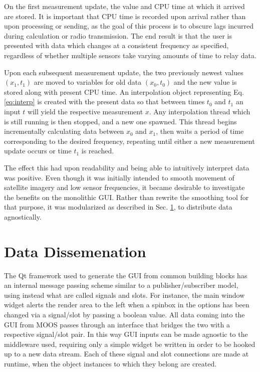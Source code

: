 \documentclass[12pt]{report}
\begin{document}
On the first measurement update, the value and CPU time at which it arrived are stored. It is important that CPU time is recorded upon arrival rather than upon processing or sending, as the goal of this process is to obscure lags incurred during calculation or radio transmission. The end result is that the user is presented with data which changes at a consistent frequency as specified, regardless of whether multiple sensors take varying amounts of time to relay data.

Upon each subsequent measurement update, the two previously newest values $(x_1,t_1)$ are moved to variables for old data $(x_0, t_0)$ and the new value is stored along with present CPU time. An interpolation object representing Eq. \ref{eq:interp} is created with the present data so that between times $t_0$ and $t_1$ an input $t$ will yield the respective measurement $x$. Any interpolation thread which is still running is then stopped, and a new one spawned. This thread begins incrementally calculating data between $x_0$ and $x_1$, then waits a period of time corresponding to the desired frequency, repeating until either a new measurement update occurs or time $t_1$ is reached.

The effect this had upon readability and being able to intuitively interpret data was positive. Even though it was initially intended to smooth movement of satellite imagery and low sensor frequencies, it became desirable to investigate the benefits on the monolithic GUI. Rather than rewrite the smoothing tool for that purpose, it was modularized as described in Sec. \ref{sec:datadiss}, to distribute data agnostically.

\section{Data Dissemenation} \label{sec:datadiss}

The Qt framework used to generate the GUI from common building blocks has an internal message passing scheme similar to a publisher/subscriber model, using instead what are called signals and slots. For instance, the main window widget alerts the render area to the left when a spinbox in the options has been changed via a signal/slot by passing a boolean value. All data coming into the GUI from MOOS passes through an interface that bridges the two with a respective signal/slot pair. In this way GUI inputs can be made agnostic to the middleware used, requiring only a simple widget be written in order to be hooked up to a new data stream. Each of these signal and slot connections are made at runtime, when the object instances to which they belong are created.
\end{document}
